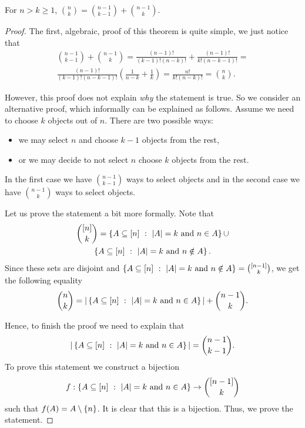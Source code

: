 \begin{theorem}
\label{theorem:pascals-rule}
  For $n > k \ge 1$, $\binom{n}{k} = \binom{n - 1}{k - 1} + \binom{n - 1}{k}$.
\end{theorem}
\begin{proof}
  The first, algebraic, proof of this theorem is quite simple, we just notice
  that
  \begin{multline*}
    \binom{n - 1}{k - 1} + \binom{n - 1}{k} =
      \frac{(n - 1)!}{(k - 1)!(n - k)!} + \frac{(n - 1)!}{k!(n - k - 1)!} = \\
      \frac{(n - 1)!}{(k - 1)! (n - k - 1)!}
        \left(
          \frac{1}{n - k} + \frac{1}{k}
        \right) = \frac{n!}{k! (n - k)!} = \binom{n}{k}.
  \end{multline*}

  However, this proof does not explain \emph{why} the statement is true.
  So we consider an alternative proof, which informally can be explained as
  follows. Assume we need to choose $k$ objects out of $n$. There are two
  possible ways:
  \begin{itemize}
    \item we may select $n$ and choose $k - 1$ objects from the rest,
    \item or we may decide to not select $n$ choose $k$ objects from the rest.
  \end{itemize}
  In the first case we have $\binom{n - 1}{k - 1}$ ways to select objects and
  in the second case we have $\binom{n - 1}{k}$ ways to select objects.

  Let us prove the statement a bit more formally. Note that
  \begin{multline*}
    \binom{[n]}{k} = \set[|A| = k \text{ and } n \in A]{A \subseteq [n]} \cup \\
    \set[|A| = k \text{ and } n \notin A]{A \subseteq [n]}.
  \end{multline*}
  Since these sets are disjoint and $\set[|A| = k \text{ and } n \notin A]{A
  \subseteq [n]} = \binom{[n - 1]}{k}$, we get the following equality
  \[
    \binom{n}{k} = |\set[|A| = k \text{ and } n \in A]{A \subseteq [n]}| +
    \binom{n - 1}{k}.
  \]

  Hence, to finish the proof we need to explain that
  \[
    |\set[|A| = k \text{ and } n \in A]{A \subseteq [n]}| =
    \binom{n - 1}{k - 1}.
  \]
  To prove this statement we construct a bijection
  \[
    f : \set[|A| = k \text{ and } n \in A]{A \subseteq [n]} \to
      \binom{[n - 1]}{k}
  \]
  such that $f(A) = A \setminus \set{n}$.
  It is clear that this is a bijection. Thus, we prove the statement.
\end{proof}

